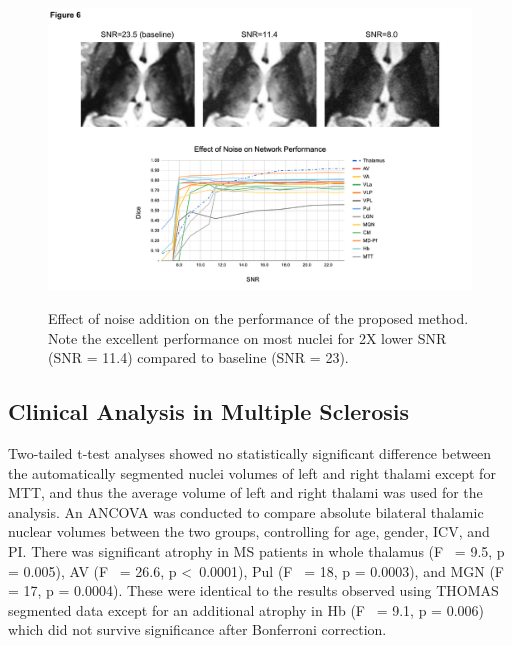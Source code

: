 \begin{figure}[!htbp]
\centering\includegraphics[width=\textwidth]{figures/pdf/slide6.pdf}\label{Thalamus.Fig.6.NoiseAddition}
\caption{{Effect of noise addition on the performance of the proposed method. Note the excellent performance on most nuclei for 2X lower SNR (SNR = 11.4) compared to baseline (SNR = 23).}}
\end{figure}


\subsection{Clinical Analysis in Multiple Sclerosis}
Two-tailed t-test analyses showed no statistically significant difference between the automatically segmented nuclei volumes of left and right thalami except for MTT, and thus the average volume of left and right thalami was used for the analysis. An ANCOVA was conducted to compare absolute bilateral thalamic nuclear volumes between the two groups, controlling for age, gender, ICV, and PI. There was significant atrophy in MS patients in whole thalamus (F~\cite{1921968:27964329,1921968:27964347} = 9.5, p = 0.005), AV (F~\cite{1921968:27964329,1921968:27964347} = 26.6, p \textless\ 0.0001), Pul (F~\cite{1921968:27964329,1921968:27964347} = 18, p = 0.0003), and MGN (F~\cite{1921968:27964329,1921968:27964347} = 17, p = 0.0004). These were identical to the results observed using THOMAS segmented data except for an additional atrophy in Hb (F~\cite{1921968:27964329,1921968:27964347} = 9.1, p = 0.006) which did not survive significance after Bonferroni correction.


